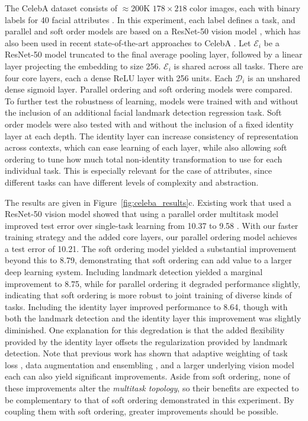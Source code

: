 \documentclass{article}
\theoremstyle{definition}
\theoremstyle{remark}
\begin{document}
The CelebA dataset consists of  $\approx$200K $178\times218$ color images, each with binary labels for 40 facial attributes \citep{Liu:2015b}.
In this experiment, each label defines a task, and parallel and soft order models are based on a ResNet-50 vision model \citep{He:2016}, which has also been used in recent state-of-the-art approaches to CelebA \citep{Gunther:2017, He:2017}.
Let $\mathcal{E}_i$ be a ResNet-50 model truncated to the final average pooling layer, followed by a linear layer projecting the embedding to size 256.
$\mathcal{E}_i$ is shared across all tasks. 
There are four core layers, each a dense ReLU layer with 256 units.
Each $\mathcal{D}_i$ is an unshared dense sigmoid layer.
Parallel ordering and soft ordering models were compared.
To further test the robustness of learning, models were trained with and without the inclusion of an additional facial landmark detection regression task.
Soft order models were also tested with and without the inclusion of a fixed identity layer at each depth.
The identity layer can increase consistency of representation across contexts, which can ease learning of each layer, while also allowing soft ordering to tune how much total non-identity transformation to use for each individual task.
This is especially relevant for the case of attributes, since different tasks can have different levels of complexity and abstraction.

The results are given in Figure~\ref{fig:celeba_results}c.
Existing work that used a ResNet-50 vision model showed that using a parallel order multitask model improved test error over single-task learning from 10.37 to 9.58 \citep{He:2017}.
With our faster training strategy and the added core layers, our parallel ordering model achieves a test error of 10.21. 
The soft ordering model yielded a substantial improvement beyond this to 8.79, demonstrating that soft ordering can add value to a larger deep learning system.
Including landmark detection yielded a marginal improvement to 8.75, while for parallel ordering it degraded performance slightly, indicating that soft ordering is more robust to joint training of diverse kinds of tasks.
Including the identity layer improved performance to 8.64, though with both the landmark detection and the identity layer this improvement was slightly diminished.
One explanation for this degredation is that the added flexibility provided by the identity layer offsets the regularization provided by landmark detection.
Note that previous work has shown that adaptive weighting of task loss \citep{He:2017, Rudd:2016}, data augmentation and ensembling \citep{Gunther:2017}, and a larger underlying vision model \citep{Lu:2016} each can also yield significant improvements.
Aside from soft ordering, none of these improvements alter the \emph{multitask topology}, so their benefits are expected to be complementary to that of soft ordering demonstrated in this experiment.
By coupling them with soft ordering, greater improvements should be possible.
\end{document}
